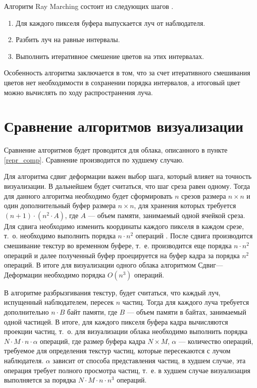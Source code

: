 Алгоритм Ray Marching состоит из следующих шагов \cite{hzd, frostbite, clouds}.
\begin{enumerate}
	\item Для каждого пикселя буфера выпускается луч от наблюдателя.
	\item Разбить луч на равные интервалы.
	\item Выполнить итеративное смешение цветов на этих интервалах.
\end{enumerate}

Особенность алгоритма заключается в том, что за счет итеративного смешивания цветов нет необходимости в сохранении порядка интервалов, а итоговый цвет можно вычислять по ходу распространения луча.

\section{Сравнение алгоритмов визуализации}

Сравнение алгоритмов будет проводится для облака, описанного в пункте \ref{repr_comp}. Сравнение производится по худшему случаю.

Для алгоритма сдвиг деформации важен выбор шага, который влияет на точность визуализации. В дальнейшем будет считаться, что шаг среза равен одному. Тогда для данного алгоритма необходимо будет сформировать $n$ срезов размера $n \times n$ и один дополнительный буфер размера $n \times n$, для хранения которых требуется $(n + 1)\cdot(n^2 \cdot A)$, где $A$ --- объем памяти, занимаемый одной ячейкой среза. Для сдвига необходимо изменить координаты каждого пикселя в каждом срезе, т.~о. необходимо выполнить порядка $n \cdot n^2$ операций \cite{shearwarp}. После сдвига производится смешивание текстур во временном буфере, т.~е. производится еще порядка $n \cdot n^2$ операций и далее полученный буфер проецируется на буфер кадра за порядка $n^2$ операций. В итоге для визуализации одного облака алгоритмом Сдвиг---Деформации необходимо порядка $O(n^3)$ операций.

В алгоритме разбрызгивания текстур, будет считаться, что каждый луч, испущенный наблюдателем, пересек $n$ частиц. Тогда для каждого луча требуется дополнительно $n\cdot B$ байт памяти, где $B$ --- объем памяти в байтах, занимаемый одной частицей. 
В итоге, для каждого пикселя буфера кадра вычисляются проекции частиц, т.~о. для визуализации облака необходимо выполнить порядка $N\cdot M \cdot n \cdot \alpha$ операций, где размер буфера кадра $N \times M$, $\alpha$ --- количество операций, требуемое для определения текстур частиц, которые пересекаются с лучом наблюдателя. $\alpha$ зависит от способа представления частиц, в худшем случае, эта операция требует полного просмотра частиц, т.~е. в худшем случае визуализация выполняется за порядка $N\cdot M \cdot n \cdot n^3$ операций. 

